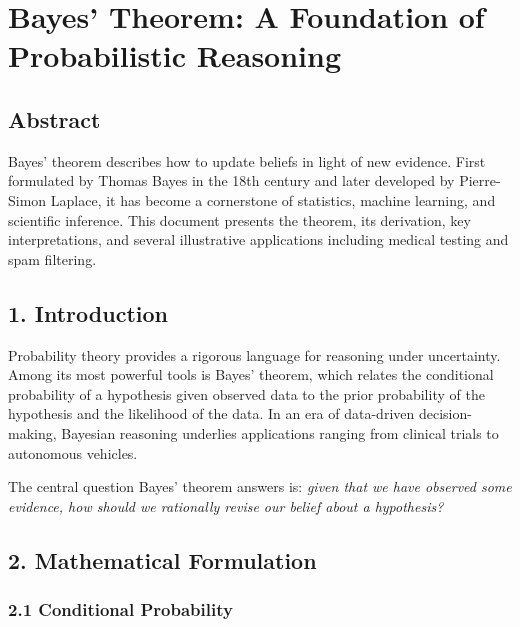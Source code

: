 \documentclass[
]{article}
\author{}
\date{}
\begin{document}
\hypertarget{bayes-theorem-a-foundation-of-probabilistic-reasoning}{%
\section{Bayes' Theorem: A Foundation of Probabilistic
Reasoning}\label{bayes-theorem-a-foundation-of-probabilistic-reasoning}}

\hypertarget{abstract}{%
\subsection{Abstract}\label{abstract}}

Bayes' theorem describes how to update beliefs in light of new evidence.
First formulated by Thomas Bayes in the 18th century and later developed
by Pierre-Simon Laplace, it has become a cornerstone of statistics,
machine learning, and scientific inference. This document presents the
theorem, its derivation, key interpretations, and several illustrative
applications including medical testing and spam filtering.

\hypertarget{introduction}{%
\subsection{1. Introduction}\label{introduction}}

Probability theory provides a rigorous language for reasoning under
uncertainty. Among its most powerful tools is Bayes' theorem, which
relates the conditional probability of a hypothesis given observed data
to the prior probability of the hypothesis and the likelihood of the
data. In an era of data-driven decision-making, Bayesian reasoning
underlies applications ranging from clinical trials to autonomous
vehicles.

The central question Bayes' theorem answers is: \emph{given that we have
observed some evidence, how should we rationally revise our belief about
a hypothesis?}

\hypertarget{mathematical-formulation}{%
\subsection{2. Mathematical
Formulation}\label{mathematical-formulation}}

\hypertarget{conditional-probability}{%
\subsubsection{2.1 Conditional
Probability}\label{conditional-probability}}
\end{document}
